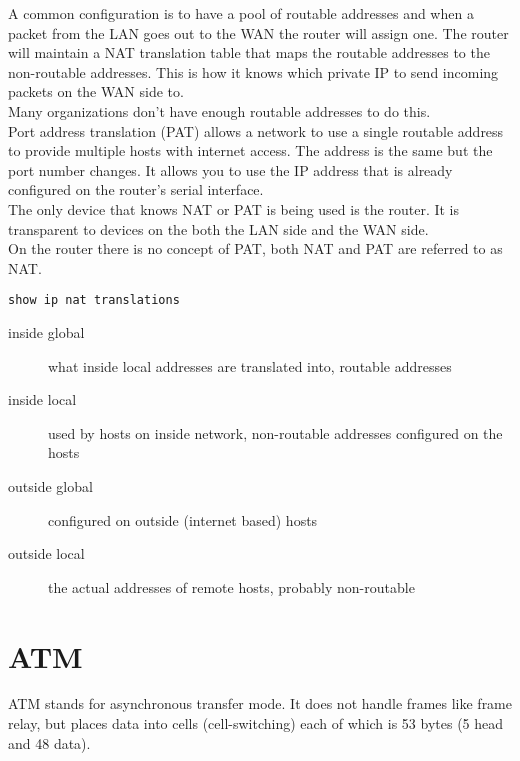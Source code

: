 \documentclass{article}
\begin{document}
A common configuration is to have a pool of routable addresses and when a
packet from the LAN goes out to the WAN the router will assign one. The
router will maintain a NAT translation table that maps the routable addresses
to the non-routable addresses. This is how it knows which private IP to
send incoming packets on the WAN side to.\\

Many organizations don't have enough routable addresses to do this.\\

Port address translation (PAT) allows a network to use a single routable
address to provide multiple hosts with internet access. The address is the
same but the port number changes. It allows you to use the IP address that is
already configured on the router's serial interface.\\

The only device that knows NAT or PAT is being used is the router. It
is transparent to devices on the both the LAN side and the WAN side.\\

On the router there is no concept of PAT, both NAT and PAT are referred to
as NAT.

\begin{verbatim}
show ip nat translations
\end{verbatim}

\begin{description}

\item[inside global]
what inside local addresses are translated into, routable addresses

\item[inside local]
used by hosts on inside network, non-routable addresses configured on the hosts

\item[outside global]
configured on outside (internet based) hosts

\item[outside local]
the actual addresses of remote hosts, probably non-routable

\end{description}

\section{ATM}

ATM stands for asynchronous transfer mode. It does not handle frames like
frame relay, but places data into cells (cell-switching) each of which is 53
bytes (5 head and 48 data).\\
\end{document}

